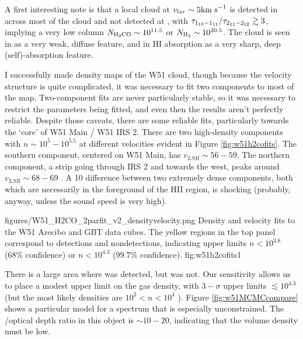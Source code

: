 A first interesting note is that a local cloud at $v_{lsr}\sim5 \textrm{km~s}^{-1}$ is
detected in \formaldehyde \oneone across most of the cloud and not detected at
\twotwo, with $\tau_{1_{10}-1_{11}}/\tau_{2_{11}-2_{12}} \gtrsim 3$, implying a
very low column
$N_{\textrm{H}_2\textrm{CO}}\sim10^{11.5}$ or $N_{\textrm{H}_{2}} \sim 10^{20.5}$.  
The cloud is seen in \thirteenco as a very weak, diffuse feature, and in HI absorption
as a very sharp, deep (self)-absorption feature.


I successfully made density maps of the W51 cloud, though because the velocity
structure is quite complicated, it was necessary to fit two components to most of the
map.  Two-component fits are never particularly stable, so it was necessary to
restrict the parameters being fitted, and even then the results aren't
perfectly reliable.  Despite those caveats, there are some reliable fits,
particularly towards the `core' of W51 Main / W51 IRS 2.  There are two
high-density components with $n\sim10^5-10^{5.5}$ \percc at different velocities evident
in Figure \ref{fig:w51h2cofits}.  The southern component, centered on W51 Main,
has $v_{LSR}\sim56-59$.  The northern component, a strip going through IRS 2
and towards the west, peaks around $v_{LSR}\sim68-69$ \kms.  A 10 \kms difference
between two extremely dense components, both which are necessarily in the
foreground of the HII region, is shocking (probably, anyway, unless the sound
speed is very high).


{figures/W51_H2CO_2parfit_v2_densityvelocity.png}
{Density and velocity fits to the W51 Arecibo and GBT \formaldehyde 
data cubes.  The yellow regions in the top panel correspond to \oneone
detections and \twotwo nondetections, indicating upper limits $n<10^{3.8}$
(68\% confidence) or $n<10^{4.3}$ (99.7\% confidence).}
{fig:w51h2cofits}{1}

There is a large area where \oneone was detected, but \twotwo was not.  Our
sensitivity allows us to place a modest upper limit on the gas density, with
$3-\sigma$ upper limits $\lesssim10^{4.3}$ \percc (but the most likely
densities are $10^2 < n < 10^4$ \percc).  Figure \ref{fig:w51MCMCcompare} shows
a particular model for a spectrum that is especially unconstrained.  The
\oneone/\twotwo optical depth ratio in this object is $\sim10-20$, indicating that
the volume density must be low.


